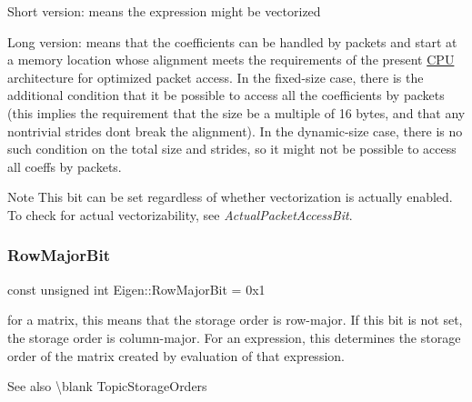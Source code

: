 Short version\+: means the expression might be vectorized

Long version\+: means that the coefficients can be handled by packets and start at a memory location whose alignment meets the requirements of the present \mbox{\hyperlink{class_c_p_u}{C\+PU}} architecture for optimized packet access. In the fixed-\/size case, there is the additional condition that it be possible to access all the coefficients by packets (this implies the requirement that the size be a multiple of 16 bytes, and that any nontrivial strides don\textquotesingle{}t break the alignment). In the dynamic-\/size case, there is no such condition on the total size and strides, so it might not be possible to access all coeffs by packets.

\begin{DoxyNote}{Note}
This bit can be set regardless of whether vectorization is actually enabled. To check for actual vectorizability, see {\itshape Actual\+Packet\+Access\+Bit}. 
\end{DoxyNote}
\mbox{\label{group__flags_gae4f56c2a60bbe4bd2e44c5b19cbe8762}} 
\subsubsection{\texorpdfstring{RowMajorBit}{RowMajorBit}}
{\footnotesize\ttfamily const unsigned int Eigen\+::\+Row\+Major\+Bit = 0x1}

for a matrix, this means that the storage order is row-\/major. If this bit is not set, the storage order is column-\/major. For an expression, this determines the storage order of the matrix created by evaluation of that expression. \begin{DoxySeeAlso}{See also}
\textbackslash{}blank Topic\+Storage\+Orders 
\end{DoxySeeAlso}

